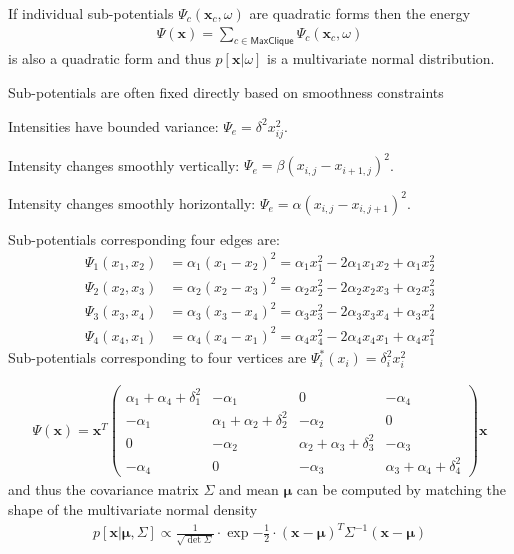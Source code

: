 \documentclass[landscape,footrule]{foils}
\renewcommand{\vec}[1]{\boldsymbol{#1}}
\begin{document}

If individual sub-potentials $\Psi_c(\vec{x}_c,\omega)$ are quadratic forms then the energy 
\begin{align*}
\Psi(\vec{x})=\sum_{c\in\textsf{MaxClique}}\Psi_c(\vec{x}_c,\omega) 
\end{align*} 
is also a quadratic form and thus $p[\vec{x}|\omega]$ is a multivariate normal distribution.\vspace*{1cm}

Sub-potentials are often fixed directly based on smoothness constraints
\begin{triangles}
\item Intensities have bounded variance: $\Psi_e=\delta^2 x_{ij}^2$. 
\item Intensity changes smoothly vertically: $\Psi_e=\beta(x_{i,j}-x_{i+1,j})^2$.
\item Intensity changes smoothly horizontally: $\Psi_e=\alpha(x_{i,j}-x_{i,j+1})^2$.
\end{triangles} 


\vspace*{-0.6cm}

Sub-potentials corresponding four edges are:  
\begin{align*}
\Psi_1(x_1,x_2)&= \alpha_1(x_{1}-x_2)^2=\alpha_1 x_1^2-2\alpha_1 x_1x_2+\alpha_1 x_2^2\\
\Psi_2(x_2,x_3)&= \alpha_2(x_{2}-x_3)^2=\alpha_2 x_2^2-2\alpha_2 x_2x_3+\alpha_2 x_3^2\\
\Psi_3(x_3,x_4)&= \alpha_3(x_{3}-x_4)^2=\alpha_3 x_3^2-2\alpha_3 x_3x_4+\alpha_3 x_4^2\\
\Psi_4(x_4,x_1)&= \alpha_4(x_{4}-x_1)^2=\alpha_4 x_4^2-2\alpha_4 x_4x_1+\alpha_4 x_1^2
\end{align*}
Sub-potentials corresponding to four vertices are $\Psi_i^*(x_i)=\delta_i^2 x_i^2$ 


\begin{align*}
\Psi(\vec{x})=\vec{x}^T
\begin{pmatrix}
\alpha_1+\alpha_4+\delta_1^2 & -\alpha_1 & 0 & -\alpha_4\\
-\alpha_1 &\alpha_1+\alpha_2+\delta_2^2 & -\alpha_2 & 0 \\
0 &-\alpha_2 &\alpha_2+\alpha_3+\delta_3^2 & -\alpha_3 \\
-\alpha_4 & 0 &-\alpha_3 &\alpha_3+\alpha_4+\delta_4^2 
\end{pmatrix}
\vec{x}
\end{align*}
and thus the covariance matrix $\Sigma$ and mean $\vec{\mu}$ can be computed by matching the shape of the multivariate normal density
\begin{align*}
p[\vec{x}|\vec{\mu},\Sigma]\propto\frac{1}{\sqrt{\det\Sigma}}\cdot\exp{-\frac{1}{2}\cdot 
(\vec{x}-\vec{\mu})^T\Sigma^{-1}(\vec{x}-\vec{\mu})}
\end{align*}
\end{document}
